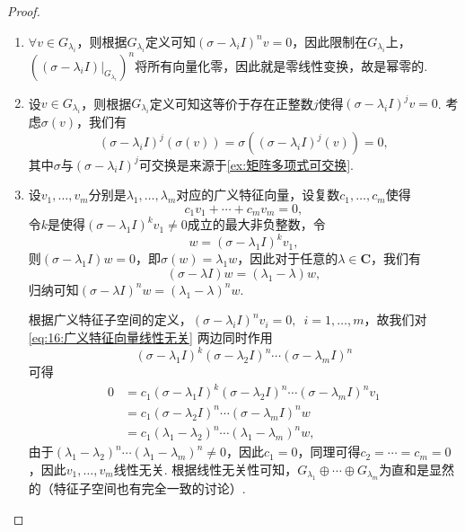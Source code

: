 \begin{proof}
    \begin{enumerate}
        \item $\forall v\in G_{\lambda_i}$，则根据$G_{\lambda_i}$定义可知$(\sigma-\lambda_i I)^nv=0$，因此限制在$G_{\lambda_i}$上，$((\sigma-\lambda_i I)\vert_{G_{\lambda_i}})^n$将所有向量化零，因此就是零线性变换，故是幂零的.

        \item 设$v\in G_{\lambda_i}$，则根据$G_{\lambda_i}$定义可知这等价于存在正整数$j$使得$(\sigma-\lambda_i I)^jv=0$. 考虑$\sigma(v)$，我们有
              \[(\sigma-\lambda_i I)^j(\sigma(v))=\sigma((\sigma-\lambda_i I)^j(v))=0,\]
              其中$\sigma$与$(\sigma-\lambda_i I)^j$可交换是来源于\autoref{ex:矩阵多项式可交换}.

        \item 设$v_1,\ldots,v_m$分别是$\lambda_1,\ldots,\lambda_m$对应的广义特征向量，设复数$c_1,\ldots,c_m$使得
              \begin{equation} \label{eq:16:广义特征向量线性无关}
                  c_1v_1+\cdots+c_mv_m=0,
              \end{equation}
              令$k$是使得$(\sigma-\lambda_1 I)^kv_1\neq 0$成立的最大非负整数，令
              \[w=(\sigma-\lambda_1 I)^{k}v_1,\]
              则$(\sigma-\lambda_1 I)w=0$，即$\sigma(w)=\lambda_1w$，因此对于任意的$\lambda\in\mathbf{C}$，我们有
              \[(\sigma-\lambda I)w=(\lambda_1-\lambda)w,\]
              归纳可知$(\sigma-\lambda I)^nw=(\lambda_1-\lambda)^nw$.

              根据广义特征子空间的定义，$(\sigma-\lambda_i I)^nv_i=0,\enspace i=1,\ldots,m$，故我们对\autoref{eq:16:广义特征向量线性无关} 两边同时作用
              \[(\sigma-\lambda_1 I)^k(\sigma-\lambda_2 I)^n\cdots(\sigma-\lambda_m I)^n\]
              可得
              \begin{align*}
                  0 & = c_1(\sigma-\lambda_1 I)^k(\sigma-\lambda_2 I)^n\cdots(\sigma-\lambda_m I)^nv_1 \\
                    & = c_1(\sigma-\lambda_2 I)^n\cdots(\sigma-\lambda_m I)^nw                         \\
                    & = c_1(\lambda_1-\lambda_2)^n\cdots(\lambda_1-\lambda_m)^nw,
              \end{align*}
              由于$(\lambda_1-\lambda_2)^n\cdots(\lambda_1-\lambda_m)^n\neq 0$，因此$c_1=0$，同理可得$c_2=\cdots=c_m=0$，因此$v_1,\ldots,v_m$线性无关. 根据线性无关性可知，$G_{\lambda_1}\oplus\cdots\oplus G_{\lambda_m}$为直和是显然的（特征子空间也有完全一致的讨论）.


\end{enumerate}
\end{proof}
